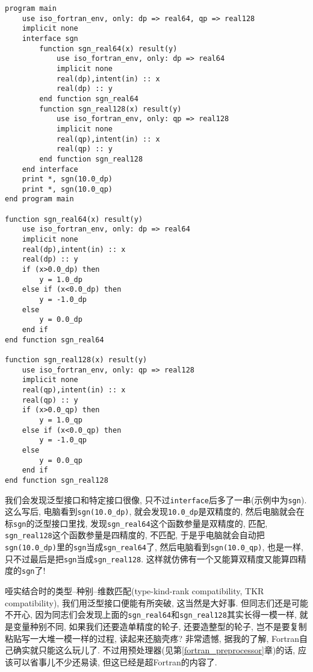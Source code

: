 \begin{lstlisting}
program main
    use iso_fortran_env, only: dp => real64, qp => real128
    implicit none
    interface sgn
        function sgn_real64(x) result(y)
            use iso_fortran_env, only: dp => real64
            implicit none
            real(dp),intent(in) :: x
            real(dp) :: y
        end function sgn_real64
        function sgn_real128(x) result(y)
            use iso_fortran_env, only: qp => real128
            implicit none
            real(qp),intent(in) :: x
            real(qp) :: y
        end function sgn_real128
    end interface
    print *, sgn(10.0_dp)
    print *, sgn(10.0_qp)
end program main

function sgn_real64(x) result(y)
    use iso_fortran_env, only: dp => real64
    implicit none
    real(dp),intent(in) :: x
    real(dp) :: y
    if (x>0.0_dp) then
        y = 1.0_dp
    else if (x<0.0_dp) then
        y = -1.0_dp
    else
        y = 0.0_dp
    end if
end function sgn_real64

function sgn_real128(x) result(y)
    use iso_fortran_env, only: qp => real128
    implicit none
    real(qp),intent(in) :: x
    real(qp) :: y
    if (x>0.0_qp) then
        y = 1.0_qp
    else if (x<0.0_qp) then
        y = -1.0_qp
    else
        y = 0.0_qp
    end if
end function sgn_real128
\end{lstlisting}
我们会发现泛型接口和特定接口很像, 只不过\texttt{interface}后多了一串(示例中为\texttt{sgn}). 这么写后, 电脑看到\texttt{sgn(10.0\_{}dp)}, 就会发现\texttt{10.0\_{}dp}是双精度的, 然后电脑就会在标\texttt{sgn}的泛型接口里找, 发现\texttt{sgn\_{}real64}这个函数参量是双精度的, 匹配, \texttt{sgn\_{}real128}这个函数参量是四精度的, 不匹配, 于是乎电脑就会自动把\texttt{sgn(10.0\_{}dp)}里的\texttt{sgn}当成\texttt{sgn\_{}real64}了, 然后电脑看到\texttt{sgn(10.0\_{}qp)}, 也是一样, 只不过最后是把\texttt{sgn}当成\texttt{sgn\_{}real128}. 这样就仿佛有一个又能算双精度又能算四精度的\texttt{sgn}了!

哑实结合时的类型--种别--维数匹配(type-kind-rank compatibility, TKR compatibility), 我们用泛型接口便能有所突破, 这当然是大好事. 但同志们还是可能不开心, 因为同志们会发现上面的\texttt{sgn\_{}real64}和\texttt{sgn\_{}real128}其实长得一模一样, 就是变量种别不同, 如果我们还要造单精度的轮子, 还要造整型的轮子, 岂不是要复制粘贴写一大堆一模一样的过程, 读起来还脑壳疼? 非常遗憾, 据我的了解, Fortran自己确实就只能这么玩儿了. 不过用预处理器(见第\ref{fortran_preprocessor}章)的话, 应该可以省事儿不少还易读, 但这已经是超Fortran的内容了.

